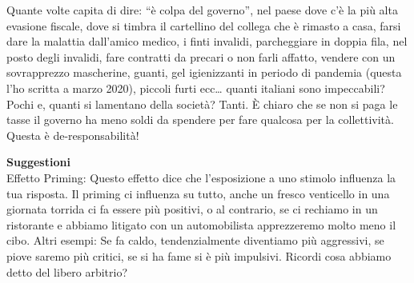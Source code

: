 \documentclass[12pt]{book} %
\begin{document}
Quante volte capita di dire: “è colpa del governo”, nel paese dove c'è la più alta evasione
fiscale, dove si timbra il cartellino del collega che è rimasto a casa, farsi dare la malattia
dall'amico medico, i finti invalidi, parcheggiare in doppia fila, nel posto degli invalidi, fare
contratti da precari o non farli affatto, vendere con un sovrapprezzo mascherine, guanti, gel igienizzanti in periodo
di pandemia (questa l'ho scritta a marzo 2020), piccoli furti ecc… quanti italiani sono
impeccabili? Pochi e, quanti si lamentano della società? Tanti. È chiaro che se non si paga le tasse il governo ha meno
soldi da spendere per fare qualcosa per la collettività. Questa è de-responsabilità!


\bigskip

\noindent \textbf{\large Suggestioni} \\
Effetto Priming: Questo effetto dice che
l'esposizione a uno stimolo influenza la tua risposta. \newline
Il priming ci influenza su tutto, anche un fresco venticello in una giornata torrida ci fa essere più positivi, o al
contrario, se ci rechiamo in un ristorante e abbiamo litigato con un automobilista apprezzeremo molto meno il cibo. 
Altri esempi: Se fa caldo, tendenzialmente diventiamo più aggressivi, se piove saremo più critici, se si ha fame si è
più impulsivi. Ricordi cosa abbiamo detto del libero arbitrio?
\end{document}
